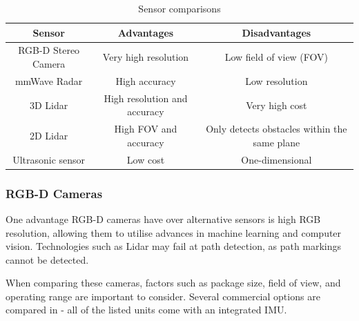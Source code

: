 \begin{table}[H]
    \centering
\begin{adjustbox}{width=\textwidth}
    \begin{tabular}{c c c}
    \toprule
    Sensor & Advantages & Disadvantages \\
    \midrule
    RGB-D Stereo Camera & Very high resolution & Low field of view (FOV) \\
    mmWave Radar & High accuracy & Low resolution \\
    3D Lidar & High resolution and accuracy & Very high cost \\
    2D Lidar & High FOV and accuracy & Only detects obstacles within the same plane \\
    Ultrasonic sensor & Low cost & One-dimensional \\
    \bottomrule
    \end{tabular}
\end{adjustbox}
    \caption{Sensor comparisons}
    \label{table:sensor_options}
\end{table}


\subsubsection{RGB-D Cameras}
One advantage RGB-D cameras have over alternative sensors is high RGB resolution,
allowing them to utilise advances in machine learning and computer vision.
Technologies such as Lidar may fail at path detection, as path markings
cannot be detected.

When comparing these cameras, factors such as package size,
field of view, and operating range are important to consider.
Several commercial options are compared in 
- all of the listed units come with an integrated IMU.

